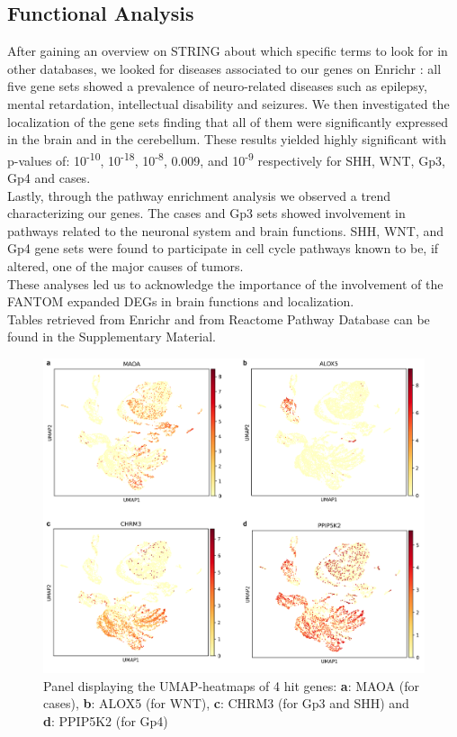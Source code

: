 \documentclass[10pt]{SelfArx} %
\begin{document}
\subsection{Functional Analysis}\label{sec:functional_results}
After gaining an overview on STRING \cite{szklarczyk2019string} about which specific terms to look for in other databases, we looked for diseases associated to our genes on Enrichr \cite{kuleshov2016enrichr}: all five gene sets showed a prevalence of neuro-related diseases such as epilepsy, mental retardation, intellectual disability and seizures.
We then investigated the localization of the gene sets finding that all of them were significantly expressed in the brain and in the cerebellum. These results yielded highly significant with p-values of: 10\textsuperscript{-10}, 10\textsuperscript{-18}, 10\textsuperscript{-8}, 0.009, and 10\textsuperscript{-9} respectively for SHH, WNT, Gp3, Gp4 and cases.\\
Lastly, through the pathway enrichment analysis we observed a trend characterizing our genes. The cases and Gp3 sets showed involvement in pathways related to the neuronal system and brain functions. SHH, WNT, and Gp4 gene sets were found to participate in cell cycle pathways known to be, if altered, one of the major causes of tumors.\\
These analyses led us to acknowledge the importance of the involvement of the FANTOM \cite{fantom5} expanded DEGs in brain functions and localization.\\
Tables retrieved from Enrichr \cite{kuleshov2016enrichr} and from Reactome Pathway Database \cite{gillespie2022reactome} can be found in the Supplementary Material.

\begin{figure}[h!]
    \centering
    \includegraphics[width=1\textwidth]{project-report/figures/umap/UMAP_panel.png}
    \caption{Panel displaying the UMAP-heatmaps of 4 hit genes: \textbf{a}: MAOA (for cases), \textbf{b}: ALOX5 (for WNT), \textbf{c}: CHRM3 (for Gp3 and SHH) and \textbf{d}: PPIP5K2 (for Gp4)}
    \label{fig:umap_panel}    
\end{figure}
\end{document}
